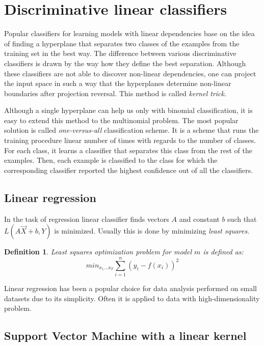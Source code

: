\documentclass{pracamgr}
\newtheorem{mydef}{Definition}
\begin{document}
\section{Discriminative linear classifiers}

Popular classifiers for learning models with linear dependencies
base on the idea of finding a hyperplane that separates two classes of the examples from the
training set in the best way. The difference between various discriminative classifiers is
drawn by the way how they define the best separation. Although these classifiers are not
able to discover non-linear dependencies, one can project the input space in such
a way that the hyperplanes determine non-linear boundaries after projection reversal.
This method is called \textit{kernel trick}.

Although a single hyperplane can help us only with binomial classification, it is easy to extend this
method to the multinomial problem. The most popular solution is called \textit{one-versus-all}
classification scheme. It is a scheme that runs the training procedure linear number of times
with regards to the number of classes. For each class, it learns a classifier that separates
this class from the rest of the examples. Then, each example is classified to the class
for which the corresponding classifier reported the highest confidence out of all the
classifiers.

\subsection{Linear regression}

In the task of regression linear classifier finds vectors $A$ and constant $b$ such that
$L(A\vec{X}+ b, Y)$ is minimized. Usually this is done by minimizing \textit{least squares}.

\begin{mydef}
Least squares optimization problem for model $m$ is defined as:
\[min_{x_1\dots x_T} \sum_{i=1}^{n} (y_{i} - f(x_{i}))^{2}\]
\end{mydef}

Linear regression has been a popular choice for data analysis performed on small datasets
due to its simplicity. Often it is applied to data with high-dimensionality problem.

\subsection{Support Vector Machine with a linear kernel}
\end{document}
